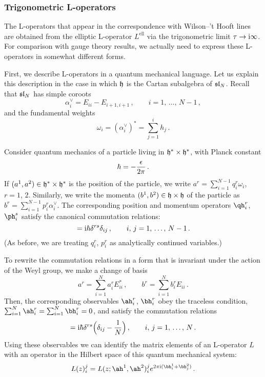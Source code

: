 \subsubsection{Trigonometric L-operators}


The L-operators that appear in the correspondence with Wilson--'t
Hooft lines are obtained from the elliptic L-operator $L^{\text{ell}}$
via the trigonometric limit $\tau \to \mathrm{i}\infty$.  For comparison with
gauge theory results, we actually need to express these L-operators in
somewhat different forms.

First, we describe L-operators in a quantum mechanical language.  Let
us explain this description in the case in which $\mathfrak{h}$ is the Cartan
subalgebra of $\mathfrak{sl}_N$.  Recall that $\mathfrak{sl}_N$ has simple coroots
\begin{equation}
  \alpha^\vee_i = E_{ii} - E_{i+1,i+1} \,,
  \qquad
  i = 1, \, \dotsc, \, N-1 \,,
\end{equation}
and the fundamental weights
\begin{equation}
  \omega_i = (\alpha^\vee_i)^* = \sum_{j=1}^i h_j \,.
\end{equation}

Consider quantum mechanics of a particle living in
$\mathfrak{h}^* \times \mathfrak{h}^*$, with Planck constant
\begin{equation}
  \hbar = -\frac{\epsilon}{2\pi} \,.
\end{equation}
If $(a^1,a^2) \in \mathfrak{h}^* \times \mathfrak{h}^*$ is the position of the particle,
we write $a^r = \sum_{i=1}^{N-1} q^r_i \omega_i$, $r = 1$, $2$.
Similarly, we write the momenta $(b^1, b^2) \in \mathfrak{h} \times \mathfrak{h}$ of the
particle as $b^r = \sum_{i=1}^{N-1} p^r_i \alpha^\vee_i$.  The
corresponding position and momentum operators $\qh^r_i$, $\ph^s_i$
satisfy the canonical commutation relations:
\begin{equation}
  [\qh_i^r, \ph_j^s] = \iu\hbar \delta^{rs} \delta_{ij} \,,
  \qquad
  i, \, j = 1, \, \dotsc, \, N-1 \,.
\end{equation}
(As before, we are treating $q^r_i$, $p^r_i$ as analytically continued
variables.)

To rewrite the commutation relations in a form that is invariant under
the action of the Weyl group, we make a change of basis
\begin{equation}
  a^r = \sum_{i=1}^N a^r_i E_{ii}^* \,,
  \qquad
  b^r = \sum_{i=1}^N b^r_i E_{ii} \,.
\end{equation}
Then, the corresponding observables $\ah^r_i$, $\bh^r_i$ obey the
traceless condition,
$\sum_{i=1}^N \ah^r_i = \sum_{i=1}^N \bh^r_i = 0$, and satisfy the
commutation relations
\begin{equation}
  [\ah_i^r, \bh_j^s]
  = \iu\hbar \delta^{rs} \Bigl(\delta_{ij} - \frac{1}{N}\Bigr) \,,
  \qquad
  i, \, j = 1, \, \dotsc, \, N \,.
\end{equation}
Using these observables we can identify the matrix elements of an
L-operator $L$ with an operator in the Hilbert space of this quantum
mechanical system:
\begin{equation}
  \label{eq:L-in-QM}
  L(z)_i^j
  = L(z; \ah^1, \ah^2)_i^j e^{2\pi\iu(\bh_i^1 + \bh_j^2)} \,.
\end{equation}

